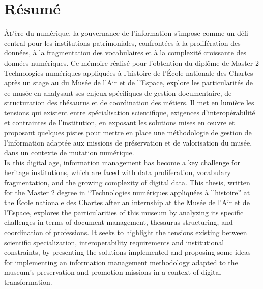 \documentclass[12pt,twoside]{book}
\begin{document}
	\thispagestyle{empty}	
	\cleardoublepage
	
	\frontmatter
	
	
	
	
	\chapter{Résumé}
	\medskip
	\lettrine{À} l’ère du numérique, la gouvernance de l’information s’impose comme un défi central pour les institutions patrimoniales, confrontées à la prolifération des données, à la fragmentation des vocabulaires et à la complexité croissante des données numériques. Ce mémoire réalisé pour l’obtention du diplôme de Master 2 \og Technologies numériques appliquées à l’histoire \fg de l’École nationale des Chartes après un stage au du Musée de l'Air et de l'Espace, explore les particularités de ce musée en analysant ses enjeux spécifiques de gestion documentaire, de structuration des thésaurus et de coordination des métiers. Il met en lumière les tensions qui existent entre spécialisation scientifique, exigences d’interopérabilité et contraintes de l'institution, en exposant les solutions mises en œuvre et proposant quelques pistes pour mettre en place une méthodologie de gestion de l'information adaptée aux missions de préservation et de valorisation du musée, dans un contexte de mutation numérique.\\
	
	\lettrine{I}{n} this digital age, information management has become a key challenge for heritage institutions, which are faced with data proliferation, vocabulary fragmentation, and the growing complexity of digital data. This thesis, written for the Master 2 degree in “Technologies numériques appliquées à l'histoire” at the École nationale des Chartes after an internship at the Musée de l'Air et de l'Espace, explores the particularities of this museum by analyzing its specific challenges in terms of document management, thesaurus structuring, and coordination of professions. It seeks to highlight the tensions existing between scientific specialization, interoperability requirements and institutional constraints, by presenting the solutions implemented and proposing some ideas for implementing an information management methodology adapted to the museum's preservation and promotion missions in a context of digital transformation.\\
	
\end{document}

